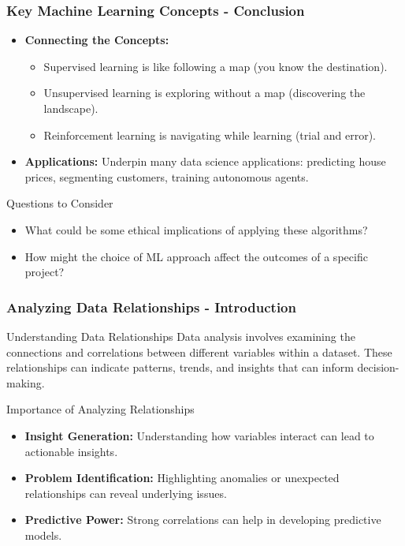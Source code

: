 \documentclass[aspectratio=169]{beamer}
\begin{document}
\begin{frame}[fragile]
    \frametitle{Key Machine Learning Concepts - Conclusion}
    \begin{itemize}
        \item \textbf{Connecting the Concepts:}
        \begin{itemize}
            \item Supervised learning is like following a map (you know the destination).
            \item Unsupervised learning is exploring without a map (discovering the landscape).
            \item Reinforcement learning is navigating while learning (trial and error).
        \end{itemize}
        \item \textbf{Applications:} Underpin many data science applications: predicting house prices, segmenting customers, training autonomous agents.
    \end{itemize}
    
    \begin{block}{Questions to Consider}
        \begin{itemize}
            \item What could be some ethical implications of applying these algorithms?
            \item How might the choice of ML approach affect the outcomes of a specific project?
        \end{itemize}
    \end{block}
\end{frame}

\begin{frame}[fragile]
    \frametitle{Analyzing Data Relationships - Introduction}
    \begin{block}{Understanding Data Relationships}
        Data analysis involves examining the connections and correlations between different variables within a dataset.
        These relationships can indicate patterns, trends, and insights that can inform decision-making.
    \end{block}
    
    \begin{block}{Importance of Analyzing Relationships}
        \begin{itemize}
            \item \textbf{Insight Generation:} Understanding how variables interact can lead to actionable insights.
            \item \textbf{Problem Identification:} Highlighting anomalies or unexpected relationships can reveal underlying issues.
            \item \textbf{Predictive Power:} Strong correlations can help in developing predictive models.
        \end{itemize}
    \end{block}
\end{frame}
\end{document}
